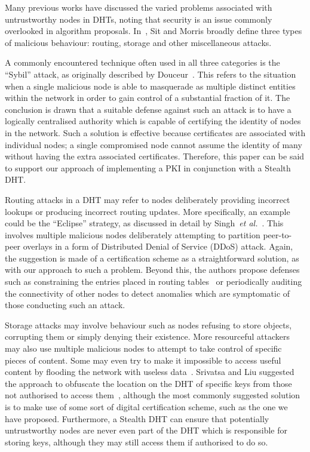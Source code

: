 \documentclass{elsart3p}
\begin{document}
Many previous works have discussed the varied problems associated
with untrustworthy nodes in DHTs, noting that security is an issue
commonly overlooked in algorithm proposals. In~\cite{Sit02Security},
Sit and Morris broadly define three types of malicious behaviour:
routing, storage and other miscellaneous attacks.

A commonly encountered technique often used in all three categories
is the ``Sybil'' attack, as originally described by
Douceur~\cite{Douceur02Sybil}. This refers to the situation when a
single malicious node is able to masquerade as multiple distinct
entities within the network in order to gain control of a
substantial fraction of it. The conclusion is drawn that a suitable
defense against such an attack is to have a logically centralised
authority which is capable of certifying the identity of nodes in
the network. Such a solution is effective because certificates are
associated with individual nodes; a single compromised node cannot
assume the identity of many without having the extra associated
certificates. Therefore, this paper can be said to support our
approach of implementing a PKI in conjunction with a Stealth DHT.

Routing attacks in a DHT may refer to nodes deliberately providing
incorrect lookups or producing incorrect routing updates. More
specifically, an example could be the ``Eclipse'' strategy, as
discussed in detail by Singh~\emph{et al.}~\cite{Singh06Eclipse}.
This involves multiple malicious nodes deliberately attempting to
partition peer-to-peer overlays in a form of Distributed Denial of
Service (DDoS) attack. Again, the suggestion is made of a
certification scheme as a straightforward solution, as with our
approach to such a problem. Beyond this, the authors propose
defenses such as constraining the entries placed in routing
tables~\cite{Castro02Secure} or periodically auditing the
connectivity of other nodes to detect anomalies which are
symptomatic of those conducting such an attack.

Storage attacks may involve behaviour such as nodes refusing to
store objects, corrupting them or simply denying their existence.
More resourceful attackers may also use multiple malicious nodes to
attempt to take control of specific pieces of content. Some may even
try to make it impossible to access useful content by flooding the
network with useless data~\cite{Liang06Index}. Srivatsa and Liu
suggested the approach to obfuscate the location on the DHT of
specific keys from those not authorised to access
them~\cite{Srivatsa05Countering}, although the most commonly
suggested solution is to make use of some sort of digital
certification scheme, such as the one we have proposed. Furthermore,
a Stealth DHT can ensure that potentially untrustworthy nodes are
never even part of the DHT which is responsible for storing keys,
although they may still access them if authorised to do so.
\end{document}
